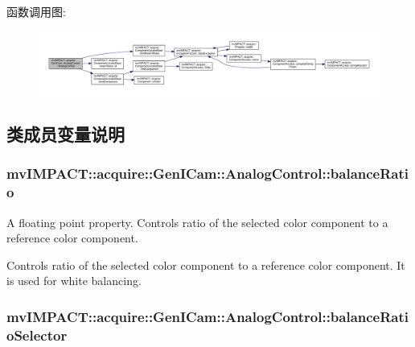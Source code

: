 函数调用图\+:
\nopagebreak
\begin{figure}[H]
\begin{center}
\leavevmode
\includegraphics[width=350pt]{classmv_i_m_p_a_c_t_1_1acquire_1_1_gen_i_cam_1_1_analog_control_a88bf85ca3c41e27b68c3af8eb12ee605_cgraph}
\end{center}
\end{figure}




\subsection{类成员变量说明}
\hypertarget{classmv_i_m_p_a_c_t_1_1acquire_1_1_gen_i_cam_1_1_analog_control_a7550a0dcc2b4d71a9431ba0090d857fc}{
\subsubsection[{balance\+Ratio}]{ mv\+I\+M\+P\+A\+C\+T\+::acquire\+::\+Gen\+I\+Cam\+::\+Analog\+Control\+::balance\+Ratio}}\label{classmv_i_m_p_a_c_t_1_1acquire_1_1_gen_i_cam_1_1_analog_control_a7550a0dcc2b4d71a9431ba0090d857fc}


A floating point property. Controls ratio of the selected color component to a reference color component. 

Controls ratio of the selected color component to a reference color component. It is used for white balancing. \hypertarget{classmv_i_m_p_a_c_t_1_1acquire_1_1_gen_i_cam_1_1_analog_control_a1834e150b5a116bc677b13735d066e9e}{
\subsubsection[{balance\+Ratio\+Selector}]{ mv\+I\+M\+P\+A\+C\+T\+::acquire\+::\+Gen\+I\+Cam\+::\+Analog\+Control\+::balance\+Ratio\+Selector}}\label{classmv_i_m_p_a_c_t_1_1acquire_1_1_gen_i_cam_1_1_analog_control_a1834e150b5a116bc677b13735d066e9e}


